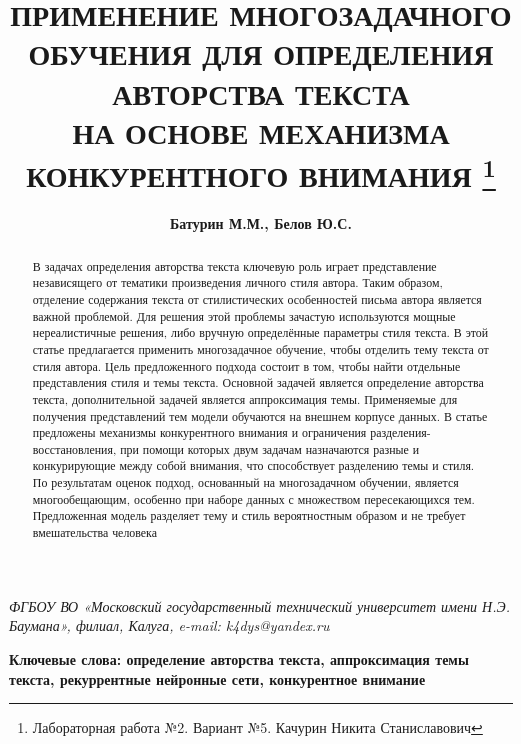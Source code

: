 \documentclass{article}
\begin{document}
\addtolength{\topmargin}{-28mm}
\addtolength{\textheight}{45mm}
\setlength{\parindent}{1.25cm}
\setlength{\parskip}{6pt}
\titleformat{\section}[block]{\normalfont\fontsize{14}{16}\bfseries}{\thesection}{1em}{}
\titlespacing*{\section}{0pt}{6pt}{6pt}
\title{
    \textbf{{ПРИМЕНЕНИЕ МНОГОЗАДАЧНОГО ОБУЧЕНИЯ}
    {ДЛЯ ОПРЕДЕЛЕНИЯ АВТОРСТВА ТЕКСТА} \\
    {НА ОСНОВЕ МЕХАНИЗМА КОНКУРЕНТНОГО ВНИМАНИЯ}}
    \thanks{Лабораторная работа №2. Вариант №5. Качурин Никита Станиславович}
}
\author{\textbf{Батурин М.М., Белов Ю.С.}}
\date{} 

\maketitle

\textit {ФГБОУ ВО «Московский государственный технический университет имени Н.Э. Баумана», 
филиал, Калуга, e-mail: k4dys@yandex.ru}

\begin{abstract}
    В задачах определения авторства текста ключевую роль играет представление независящего от тематики произведения личного стиля автора. Таким образом, отделение содержания текста от стилистических 
особенностей письма автора является важной проблемой. Для решения этой проблемы зачастую используются мощные нереалистичные решения, либо вручную определённые параметры стиля текста. В этой 
статье предлагается применить многозадачное обучение, чтобы отделить тему текста от стиля автора. Цель 
предложенного подхода состоит в том, чтобы найти отдельные представления стиля и темы текста. 
Основной задачей является определение авторства текста, дополнительной задачей является аппроксимация темы. 
Применяемые для получения представлений тем модели обучаются на внешнем корпусе данных. В статье 
предложены механизмы конкурентного внимания и ограничения разделения-восстановления, при помощи 
которых двум задачам назначаются разные и конкурирующие между собой внимания, что способствует разделению темы и стиля. По результатам оценок подход, основанный на многозадачном обучении, является 
многообещающим, особенно при наборе данных с множеством пересекающихся тем. Предложенная модель 
разделяет тему и стиль вероятностным образом и не требует вмешательства человека
\end{abstract}
\textbf{Ключевые слова: определение авторства текста, аппроксимация темы текста, рекуррентные нейронные сети, 
конкурентное внимание}
\end{document}
